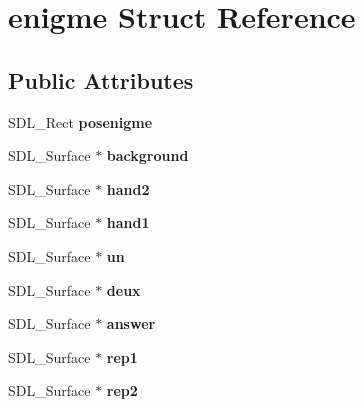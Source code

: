 \hypertarget{structenigme}{}\section{enigme Struct Reference}
\label{structenigme}
\subsection*{Public Attributes}
\begin{DoxyCompactItemize}
\item 
\mbox{\label{structenigme_ac8828b9af135141d0a37bd4c565330f9}} 
S\+D\+L\+\_\+\+Rect {\bfseries posenigme}
\item 
\mbox{\label{structenigme_afef580eaca259227dac7bbae2d09f8f7}} 
S\+D\+L\+\_\+\+Surface $\ast$ {\bfseries background}
\item 
\mbox{\label{structenigme_ab3814374ba66c4063e6475f9cecf99c0}} 
S\+D\+L\+\_\+\+Surface $\ast$ {\bfseries hand2}
\item 
\mbox{\label{structenigme_a8203d1ceadd8d0cd31122b420cae2aae}} 
S\+D\+L\+\_\+\+Surface $\ast$ {\bfseries hand1}
\item 
\mbox{\label{structenigme_adcbcd8ededa76b3b7fb1e8b80c4475ee}} 
S\+D\+L\+\_\+\+Surface $\ast$ {\bfseries un}
\item 
\mbox{\label{structenigme_ac4aaee9077b4777ca5bf1dcce19f3bc2}} 
S\+D\+L\+\_\+\+Surface $\ast$ {\bfseries deux}
\item 
\mbox{\label{structenigme_a5b9bd47c2083476b1c20af8544b3e58e}} 
S\+D\+L\+\_\+\+Surface $\ast$ {\bfseries answer}
\item 
\mbox{\label{structenigme_a71496547ba4aff7035d278b0db7f3a2a}} 
S\+D\+L\+\_\+\+Surface $\ast$ {\bfseries rep1}
\item 
\mbox{\label{structenigme_a86d84c35e5efd16e4cd5e44f3db5b35b}} 
S\+D\+L\+\_\+\+Surface $\ast$ {\bfseries rep2}
\item 
\mbox{\label{structenigme_a2b242af0e564a9a8717a5b36e84d0385}} 

\end{DoxyCompactItemize}
